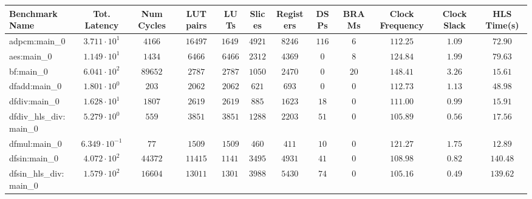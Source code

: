 \begin{tabular}{|l|c|c|c|c|c|c|c|c|c|c|c|}
\hline
Benchmark Name          & Tot. Latency            & Num Cycles & LUT pairs  & LUTs       & Slices    & Registers & DSPs    & BRAMs   & Clock Frequency & Clock Slack & HLS Time(s) \\
\hline
adpcm:main\_0           & $ 3.711 \cdot 10^{1}  $ & $ 4166   $ & $ 16497  $ & $ 16497  $ & $ 4921  $ & $ 8246  $ & $ 116 $ & $ 6   $ & $ 112.25      $ & $ 1.09    $ & $ 72.90   $ \\
aes:main\_0             & $ 1.149 \cdot 10^{1}  $ & $ 1434   $ & $ 6466   $ & $ 6466   $ & $ 2312  $ & $ 4369  $ & $ 0   $ & $ 8   $ & $ 124.84      $ & $ 1.99    $ & $ 79.63   $ \\
bf:main\_0              & $ 6.041 \cdot 10^{2}  $ & $ 89652  $ & $ 2787   $ & $ 2787   $ & $ 1050  $ & $ 2470  $ & $ 0   $ & $ 20  $ & $ 148.41      $ & $ 3.26    $ & $ 15.61   $ \\
dfadd:main\_0           & $ 1.801 \cdot 10^{0}  $ & $ 203    $ & $ 2062   $ & $ 2062   $ & $ 621   $ & $ 693   $ & $ 0   $ & $ 0   $ & $ 112.73      $ & $ 1.13    $ & $ 48.98   $ \\
dfdiv:main\_0           & $ 1.628 \cdot 10^{1}  $ & $ 1807   $ & $ 2619   $ & $ 2619   $ & $ 885   $ & $ 1623  $ & $ 18  $ & $ 0   $ & $ 111.00      $ & $ 0.99    $ & $ 15.91   $ \\
dfdiv\_hls\_div:main\_0 & $ 5.279 \cdot 10^{0}  $ & $ 559    $ & $ 3851   $ & $ 3851   $ & $ 1288  $ & $ 2203  $ & $ 51  $ & $ 0   $ & $ 105.89      $ & $ 0.56    $ & $ 17.56   $ \\
dfmul:main\_0           & $ 6.349 \cdot 10^{-1} $ & $ 77     $ & $ 1509   $ & $ 1509   $ & $ 460   $ & $ 411   $ & $ 10  $ & $ 0   $ & $ 121.27      $ & $ 1.75    $ & $ 12.89   $ \\
dfsin:main\_0           & $ 4.072 \cdot 10^{2}  $ & $ 44372  $ & $ 11415  $ & $ 11415  $ & $ 3495  $ & $ 4931  $ & $ 41  $ & $ 0   $ & $ 108.98      $ & $ 0.82    $ & $ 140.48  $ \\
dfsin\_hls\_div:main\_0 & $ 1.579 \cdot 10^{2}  $ & $ 16604  $ & $ 13011  $ & $ 13011  $ & $ 3988  $ & $ 5430  $ & $ 74  $ & $ 0   $ & $ 105.16      $ & $ 0.49    $ & $ 139.62  $ \\

\end{tabular}
